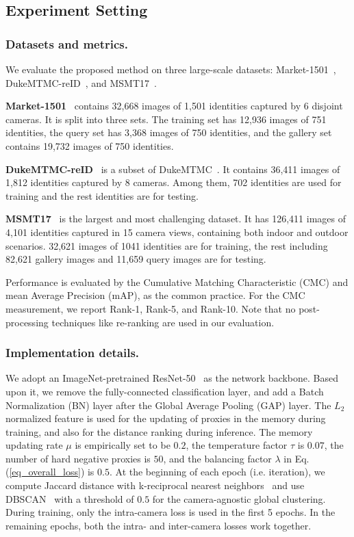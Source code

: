 \documentclass[letterpaper]{article} %
\begin{document}
\subsection{Experiment Setting}
\subsubsection{Datasets and metrics.}
We evaluate the proposed method on three large-scale datasets: Market-1501~\cite{7410490}, DukeMTMC-reID~\cite{zheng2017unlabeled}, and MSMT17~\cite{wei2018person}.

\textbf{Market-1501}~\cite{7410490} contains 32,668 images of 1,501 identities captured by 6 disjoint cameras. It is split into three sets. The training set has 12,936 images of 751 identities, the query set has 3,368 images of 750 identities, and the gallery set contains 19,732 images of 750 identities.

\textbf{DukeMTMC-reID}~\cite{zheng2017unlabeled} is a subset of DukeMTMC~\cite{ristani2016performance}. It contains 36,411 images of 1,812 identities captured by 8 cameras. Among them, 702 identities are used for training and the rest identities are for testing.

\textbf{MSMT17}~\cite{wei2018person} is the largest and most challenging dataset. It has 126,411 images of 4,101 identities captured in 15 camera views, containing both indoor and outdoor scenarios. 32,621 images of 1041 identities are for training, the rest including 82,621 gallery images and 11,659 query images are for testing.


Performance is evaluated by the Cumulative Matching Characteristic (CMC) and mean Average Precision (mAP), as the common practice. For the CMC measurement, we report Rank-1, Rank-5, and Rank-10. Note that no post-processing techniques like re-ranking \cite{Zhong2017reranking} are used in our evaluation.


\subsubsection{Implementation details.}
We adopt an ImageNet-pretrained ResNet-50~\cite{he2016deep} as the network backbone. Based upon it, we remove the fully-connected classification layer, and add a Batch Normalization (BN) layer after the Global Average Pooling (GAP) layer. The $L_2$ normalized feature is used for the updating of proxies in the memory during training, and also for the distance ranking during inference. The memory updating rate $\mu$ is empirically set to be $0.2$, the temperature factor $\tau$ is $0.07$, the number of hard negative proxies is $50$, and the balancing factor $\lambda$ in Eq. (\ref{eq_overall_loss}) is $0.5$. At the beginning of each epoch (i.e. iteration), we compute Jaccard distance with k-reciprocal nearest neighbors~\cite{Zhong2017reranking} and use DBSCAN~\cite{ester1996density} with a threshold of $0.5$ for the camera-agnostic global clustering. During training, only the intra-camera loss is used in the first 5 epochs. In the remaining epochs, both the intra- and inter-camera losses work together.
\end{document}
